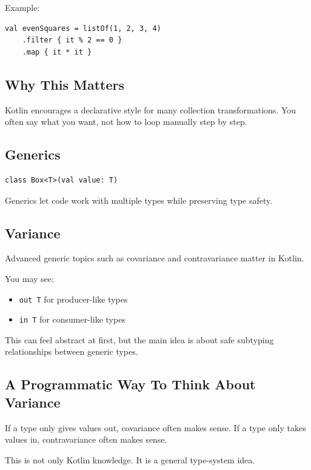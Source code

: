 \documentclass[11pt,a4paper]{article}
\begin{document}
Example:

\begin{lstlisting}[style=kazekotlin]
val evenSquares = listOf(1, 2, 3, 4)
    .filter { it % 2 == 0 }
    .map { it * it }
\end{lstlisting}

\subsection{Why This Matters}

Kotlin encourages a declarative style for many collection transformations. You often say what you want, not how to loop manually step by step.

\subsection{Generics}

\begin{lstlisting}[style=kazekotlin]
class Box<T>(val value: T)
\end{lstlisting}

Generics let code work with multiple types while preserving type safety.

\subsection{Variance}

Advanced generic topics such as covariance and contravariance matter in Kotlin.

You may see:
\begin{itemize}
    \item \texttt{out T} for producer-like types
    \item \texttt{in T} for consumer-like types
\end{itemize}

This can feel abstract at first, but the main idea is about safe subtyping relationships between generic types.

\subsection{A Programmatic Way To Think About Variance}

If a type only gives values out, covariance often makes sense.
If a type only takes values in, contravariance often makes sense.

This is not only Kotlin knowledge. It is a general type-system idea.
\end{document}
